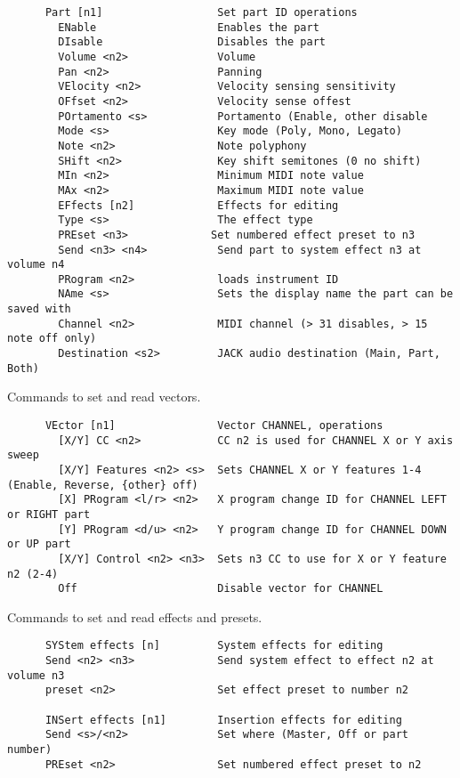 \begin{verbatim}
      Part [n1]                  Set part ID operations
        ENable                   Enables the part
        DIsable                  Disables the part
        Volume <n2>              Volume
        Pan <n2>                 Panning
        VElocity <n2>            Velocity sensing sensitivity
        OFfset <n2>              Velocity sense offest
        POrtamento <s>           Portamento (Enable, other disable
        Mode <s>                 Key mode (Poly, Mono, Legato)
        Note <n2>                Note polyphony
        SHift <n2>               Key shift semitones (0 no shift)
        MIn <n2>                 Minimum MIDI note value
        MAx <n2>                 Maximum MIDI note value
        EFfects [n2]             Effects for editing
        Type <s>                 The effect type
        PREset <n3>             Set numbered effect preset to n3
        Send <n3> <n4>           Send part to system effect n3 at volume n4
        PRogram <n2>             loads instrument ID
        NAme <s>                 Sets the display name the part can be saved with
        Channel <n2>             MIDI channel (> 31 disables, > 15 note off only)
        Destination <s2>         JACK audio destination (Main, Part, Both)
\end{verbatim}

   Commands to set and read vectors.

\begin{verbatim}
      VEctor [n1]                Vector CHANNEL, operations
        [X/Y] CC <n2>            CC n2 is used for CHANNEL X or Y axis sweep
        [X/Y] Features <n2> <s>  Sets CHANNEL X or Y features 1-4 (Enable, Reverse, {other} off)
        [X] PRogram <l/r> <n2>   X program change ID for CHANNEL LEFT or RIGHT part
        [Y] PRogram <d/u> <n2>   Y program change ID for CHANNEL DOWN or UP part
        [X/Y] Control <n2> <n3>  Sets n3 CC to use for X or Y feature n2 (2-4)
        Off                      Disable vector for CHANNEL
\end{verbatim}

   Commands to set and read effects and presets.

\begin{verbatim}
      SYStem effects [n]         System effects for editing
      Send <n2> <n3>             Send system effect to effect n2 at volume n3
      preset <n2>                Set effect preset to number n2

      INSert effects [n1]        Insertion effects for editing
      Send <s>/<n2>              Set where (Master, Off or part number)
      PREset <n2>                Set numbered effect preset to n2
\end{verbatim}

